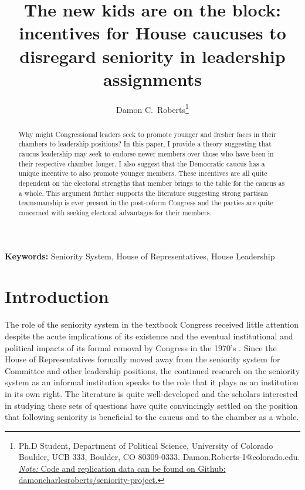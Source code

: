 \documentclass [12pt]{article}
\title{The new kids are on the block: incentives for House caucuses to disregard seniority in leadership assignments}
\author{Damon C.\ Roberts\footnote{Ph.D Student,
Department of Political Science, University of Colorado Boulder, UCB 333, Boulder, CO 80309-0333. Damon.Roberts-1@colorado.edu. 
\newline \href{https://github.com/DamonCharlesRoberts/seniority-project}{\textit{Note: }Code and replication data can be found on Github: damoncharlesroberts/seniority-project.}}}}
\date{}
\begin{document}
\maketitle
\begin{abstract}

Why might Congressional leaders seek to promote younger and fresher faces in their chambers to leadership positions? In this paper, I provide a theory suggesting that caucus leadership may seek to endorse newer members over those who have been in their respective chamber longer. I also suggest that the Democratic caucus has a unique incentive to also promote younger members. These incentives are all quite dependent on the electoral strengths that member brings to the table for the caucus as a whole. This argument further supports the literature suggesting strong partisan teamsmanship is ever present in the post-reform Congress and the parties are quite concerned with seeking electoral advantages for their members.

\end{abstract}

\textbf{Keywords: } Seniority System, House of Representatives, House Leadership

\newpage
\doublespace
\newpage 
\section*{Introduction}

The role of the seniority system in the textbook Congress received little attention despite the acute implications of its existence and the eventual institutional and political impacts of its formal removal by Congress in the 1970's \cite{Celler1961}. Since the House of Representatives formally moved away from the seniority system for Committee and other leadership positions, the continued research on the seniority system as an informal institution speaks to the role that it plays as an institution in its own right. The literature is quite well-developed and the scholars interested in studying these sets of questions have quite convincingly settled on the position that following seniority is beneficial to the caucus and to the chamber as a whole.
\end{document}
